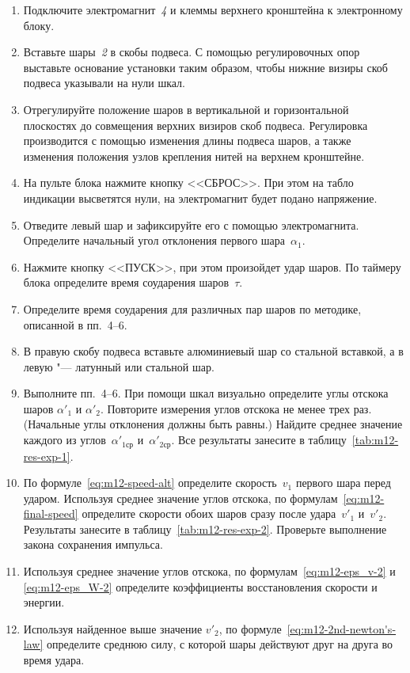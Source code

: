 \documentclass[a4paper, 12pt]{extarticle}
\begin{document}
\begin{enumerate}
\item Подключите электромагнит~\emph{4} и клеммы верхнего кронштейна к электронному блоку.
\item Вставьте шары~\emph{2} в скобы подвеса. С помощью регулировочных опор выставьте основание установки таким образом, чтобы нижние визиры скоб подвеса указывали на нули шкал.
\item Отрегулируйте положение шаров в вертикальной и горизонтальной плоскостях до совмещения верхних визиров скоб подвеса. Регулировка производится с помощью изменения длины подвеса шаров, а также изменения положения узлов крепления нитей на верхнем кронштейне.
\item На пульте блока нажмите кнопку <<СБРОС>>. При этом на табло индикации высветятся нули, на электромагнит будет подано напряжение.
\item Отведите левый шар и зафиксируйте его с помощью электромагнита. Определите начальный угол отклонения первого шара~$\alpha_1$.
\item Нажмите кнопку <<ПУСК>>, при этом произойдет удар шаров. По таймеру блока определите время соударения шаров~$\tau$.
\item Определите время соударения для различных пар шаров по методике, описанной в пп.~4--6.
\item В правую скобу подвеса вставьте алюминиевый шар со стальной вставкой, а в левую "--- латунный или стальной шар.
\item Выполните пп.~4--6. При помощи шкал визуально определите углы отскока шаров $\alpha'_1$  и $\alpha'_2$. Повторите измерения углов отскока не менее  трех раз. (Начальные углы отклонения должны быть равны.) Найдите среднее значение каждого из углов~$\alpha'_{1\text{ср}}$ и~$\alpha'_{2\text{ср}}$. Все результаты занесите в таблицу~\ref{tab:m12-res-exp-1}. %
\item По формуле~\eqref{eq:m12-speed-alt} определите скорость~$v_1$ первого шара перед ударом. Используя среднее значение углов отскока, по формулам~\eqref{eq:m12-final-speed} определите скорости обоих шаров сразу после удара~$v'_1$  и~$v'_2$. Результаты занесите в таблицу~\ref{tab:m12-res-exp-2}. Проверьте выполнение закона сохранения импульса. %
\item Используя среднее значение углов отскока, по формулам~\eqref{eq:m12-eps_v-2} и \eqref{eq:m12-eps_W-2} определите коэффициенты восстановления скорости и энергии. %
\item Используя найденное выше значение $v'_2$, по формуле~\eqref{eq:m12-2nd-newton's-law} определите среднюю силу, с которой шары действуют друг на друга во время удара.


\end{enumerate}
\end{document}

